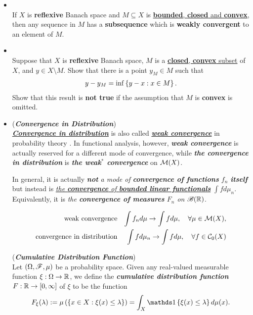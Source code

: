 \documentclass[11pt]{article}
\begin{document}
\begin{itemize}
\item \begin{corollary}\citep{rynne2007linear}\\
If $X$ is \textbf{reflexive} Banach space and $M \subseteq X$ is \underline{\textbf{bounded}, \textbf{closed} and \textbf{convex}}, then any sequence
in $M$ has a \textbf{subsequence} which is \textbf{weakly convergent} to an element of $M$.
\end{corollary}

\item \begin{exercise}\citep{rynne2007linear}\\
Suppose that $X$ is \textbf{reflexive} Banach space, $M$ is a \underline{\textbf{closed}, \textbf{convex} subset} of $X$, and
$y \in X \setminus M$.  Show that there is a point $y_M \in M$ such that
\begin{align*}
y - y_M = \inf\left\{y- x: x \in M\right\}.
\end{align*}
Show that this result is \textbf{not true} if the assumption that $M$ is \textbf{convex} is omitted.
\end{exercise}

\item \begin{example} (\emph{\textbf{Convergence in Distribution}})\\
\underline{\emph{\textbf{Convergence in distribution}}} is also called \underline{\emph{\textbf{weak convergence}}} in probability theory \citep{folland2013real}. In functional analysis, however, \emph{\textbf{weak convergence}} is actually reserved for a different mode of convergence, while \emph{\textbf{the convergence in distribution}} is \emph{\textbf{the weak$^*$ convergence}} on ${\mathcal M}(X)$.

In general, it is actually \emph{\textbf{not} a mode of \textbf{convergence of functions} $f_n$ \textbf{itself}} but instead is \underline{\emph{the \textbf{convergence} of \textbf{bounded linear functionals}}} $\int f d\mu_n$. Equivalently, it is \emph{the \textbf{convergence of measures} $F_n$ on ${\mathscr B}({\mathbb R})$}.

\begin{align*}
 \text{weak convergence} && \int f_n d\mu \rightarrow \int f d\mu, \quad \forall \mu \in {\mathcal M}(X), \\
\text{convergence in distribution}  &&  \int f d\mu_n \rightarrow \int f d\mu, \quad \forall f \in {\mathcal C}_{0}(X)
\end{align*}

\begin{definition} (\emph{\textbf{Cumulative Distribution Function}}) \citep{van2000asymptotic} \\
Let $(\Omega,{\mathscr F}, \mu)$ be a probability space. Given any real-valued measurable function $\xi : \Omega \rightarrow {\mathbb R}$, we define the \emph{\textbf{cumulative distribution function}} $F : {\mathbb R} \rightarrow [0, \infty]$ of $\xi$ to be the function
\begin{align*}
F_{\xi}(\lambda) :=  \mu\paren{\set{x \in  X : \xi(x) \le \lambda}} = \int_{X} \ind{\xi(x) \le \lambda}d\mu(x).
\end{align*}
\end{definition}


\end{example}
\end{itemize}
\end{document}
